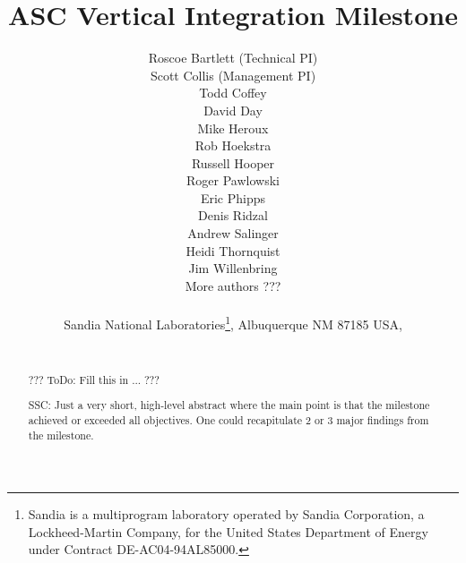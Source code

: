 \documentclass[pdf,ps2pdf,11pt]{SANDreport}
\title{\center
ASC Vertical Integration Milestone
}
\author{
Roscoe Bartlett (Technical PI) \\
Scott Collis (Management PI) \\
Todd Coffey \\
David Day \\
Mike Heroux \\
Rob Hoekstra \\
Russell Hooper \\
Roger Pawlowski \\
Eric Phipps \\
Denis Ridzal \\
Andrew Salinger \\
Heidi Thornquist \\
Jim Willenbring \\
More authors ???\\ \\
Sandia National
Laboratories\footnote{ Sandia is a multiprogram laboratory operated by Sandia
Corporation, a Lockheed-Martin Company, for the United States Department of
Energy under Contract DE-AC04-94AL85000.}, Albuquerque NM 87185 USA, \\ \\
\date{}
}
\date{}
\begin{document}
\maketitle

%

%
\begin{abstract}
%

??? ToDo: Fill this in ... ???

\bigskip
SSC: Just a very short, high-level abstract where the main point is that the
milestone achieved or exceeded all objectives.  One could recapitulate 2 or 3
major findings from the milestone.

%
\end{abstract}
%

%
%
%

%
\clearpage
\tableofcontents


\end{document}
